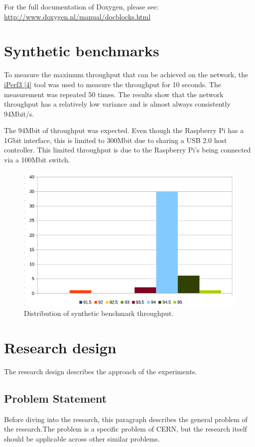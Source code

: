 \documentclass[]{article}
\begin{document}
For the full documentation of Doxygen, please see: \url{http://www.doxygen.nl/manual/docblocks.html}

\section{Synthetic benchmarks}
To measure the maximum throughput that can be achieved on the network, the \hyperref[sec:ref04]{iPerf3 [4]} tool was used to measure the throughput for 10 seconds. The measurement was repeated 50 times. The results show that the network throughput has a relatively low variance and is almost always consistently 94Mbit/s.

The 94Mbit of throughput was expected. Even though the Raspberry Pi has a 1Gbit interface, this is limited to 300Mbit due to sharing a USB 2.0 host controller. This limited throughput is due to the Raspberry Pi’s being connected via a 100Mbit switch.

\begin{center}
	\begin{figure}[H]
		\includegraphics[width=\textwidth]{images/network-benchmark}
		\caption{Distribution of synthetic benchmark throughput.}
		\label{fig:ssh}
	\end{figure}
\end{center}

\section{Research design}
The research design describes the approach of the experiments.

\subsection{Problem Statement}
Before diving into the research, this paragraph describes the general problem of the research.The problem is a specific problem of CERN, but the research itself should be applicable across other similar problems.
\end{document}
